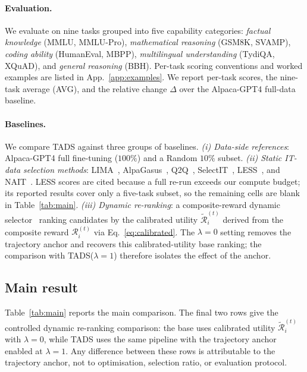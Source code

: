 \paragraph{Evaluation.}
We evaluate on nine tasks grouped into five capability categories:
\emph{factual knowledge} (MMLU, MMLU-Pro), \emph{mathematical
reasoning} (GSM8K, SVAMP), \emph{coding ability} (HumanEval, MBPP),
\emph{multilingual understanding} (TydiQA, XQuAD), and
\emph{general reasoning} (BBH). Per-task scoring conventions and
worked examples are listed in App.~\ref{app:examples}. We report
per-task scores, the nine-task average (AVG), and the relative
change $\Delta$ over the Alpaca-GPT4 full-data baseline.

\paragraph{Baselines.}
We compare \textsc{TADS} against three groups of baselines.
\emph{(i) Data-side references}: Alpaca-GPT4 full fine-tuning
($100\%$) and a Random $10\%$ subset. \emph{(ii) Static IT-data
selection methods}: LIMA~\cite{zhou2023lima},
AlpaGasus~\cite{alpagasus}, Q2Q~\cite{q2q},
SelectIT~\cite{selectit}, LESS~\cite{less}, and
NAIT~\cite{nait2026}. LESS scores are cited because a full re-run
exceeds our compute budget; its reported results cover only a
five-task subset, so the remaining cells are blank in
Table~\ref{tab:main}. \emph{(iii) Dynamic re-ranking}: a
composite-reward dynamic selector~\cite{kung2023activeit,
sun2025dots} ranking candidates by the calibrated utility
$\tilde{\mathcal{R}}_i^{(t)}$ derived from the composite reward
$\mathcal{R}_i^{(t)}$ via Eq.~\ref{eq:calibrated}. The $\lambda=0$
setting removes the trajectory anchor and recovers this
calibrated-utility base ranking; the comparison with
\textsc{TADS}($\lambda{=}1$) therefore isolates the effect of the
anchor.

\subsection{Main result}
\label{sec:main}

Table~\ref{tab:main} reports the main comparison. The final two
rows give the controlled dynamic re-ranking comparison: the base
uses calibrated utility $\tilde{\mathcal{R}}_i^{(t)}$ with
$\lambda=0$, while \textsc{TADS} uses the same pipeline with the
trajectory anchor enabled at $\lambda=1$. Any difference between
these rows is attributable to the trajectory anchor, not to
optimisation, selection ratio, or evaluation protocol.

